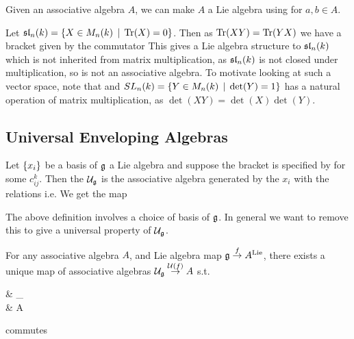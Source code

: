 \documentclass{article}
\begin{document}
\begin{example}
Given an associative algebra $A$, we can make $A$ a Lie algebra using 
for $a,b \in A$. 
\end{example}

\begin{example}
Let $\mathfrak{sl}_n(k) = \left\{ X \in M_n(k) \, \mid \, \operatorname{Tr}(X) = 0 \right\}$. Then as $\operatorname{Tr}(XY) = \operatorname{Tr}(YX)$ we have a bracket given by the commutator 
This gives a Lie algebra structure to $\mathfrak{sl}_n(k)$ which is not inherited from matrix multiplication, as $\mathfrak{sl}_n(k)$ is not closed under multiplication, so is not an associative algebra. To motivate looking at such a vector space, note that 
and $SL_n(k) = \left\{ Y \in M_n(k) \, \mid \, \det(Y) = 1 \right\}$ has a natural operation of matrix multiplication, as $\det(XY) = \det(X)\det(Y)$. 
\end{example}

\subsection{Universal Enveloping Algebras}

\begin{definition}
Let $\left\{ x_i \right\}$ be a basis of $\mathfrak{g}$ a Lie algebra and suppose the bracket is specified by 
for some  $c_{ij}^k$. Then the  $\mathcal{U}_{\mathfrak{g}}$ is the associative algebra generated by the $x_i$ with the relations 
i.e. 
We get the map 
\end{definition}

\begin{remark}
The above definition involves a choice of basis of $\mathfrak{g}$. In general we want to remove this to give a universal property of $\mathcal{U}_{\mathfrak{g}}$. 
\end{remark}

\begin{prop}
For any associative algebra $A$, and Lie algebra map $\mathfrak{g} \overset{f}{\to} A^{\text{Lie}}$, there exists a unique map of associative algebras $\mathcal{U}_{\mathfrak{g}} \overset{\mathcal{U}(f)}{\to} A$ s.t. 
\begin{tkz}
& _ \arrow[d,"\mc{U}(f)"] \\
 \arrow[ur,"\iota"] \arrow[r,"f"] & A
\end{tkz}
commutes
\end{prop}
\end{document}
